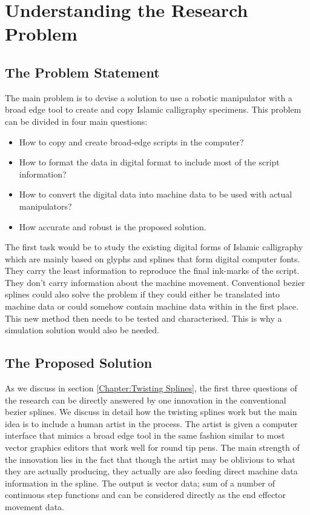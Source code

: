 \section{Understanding the Research Problem}\label{Chapter:Problem Statement}
{
    \subsection{The Problem Statement}
    {
        The main problem is to devise a solution to use a robotic manipulator with a broad edge tool to create and copy Islamic calligraphy specimens. This problem can be divided in four main questions:
        \begin{itemize}
          \item How to copy and create broad-edge scripts in the computer?
          \item How to format the data in digital format to include most of the script information?
          \item How to convert the digital data into machine data to be used with actual manipulators?
          \item How accurate and robust is the proposed solution.
        \end{itemize}

        The first task would be to study the existing digital forms of Islamic calligraphy which are mainly based on glyphs and splines that form digital computer fonts. They carry the least information to reproduce the final ink-marks of the script. They don’t carry information about the machine movement. Conventional bezier splines could also solve the problem if they could either be translated into machine data or could somehow contain machine data within in the first place. This new method then needs to be tested and characterised. This is why a simulation solution would also be needed.

    }
    \subsection{The Proposed Solution}
    {
        As we discuss in section \ref{Chapter:Twisting Splines}, the first three questions of the research can be directly answered by one innovation in the conventional bezier splines. We discuss in detail how the twisting splines work but the main idea is to include a human artist in the process. The artist is given a computer interface that mimics a broad edge tool in the same fashion similar to most vector graphics editors that work well for round tip pens. The main strength of the innovation lies in the fact that though the artist may be oblivious to what they are actually producing, they actually are also feeding direct machine data information in the spline. The output is vector data; sum of a number of continuous step functions and can be considered directly as the end effector movement data.

}}
